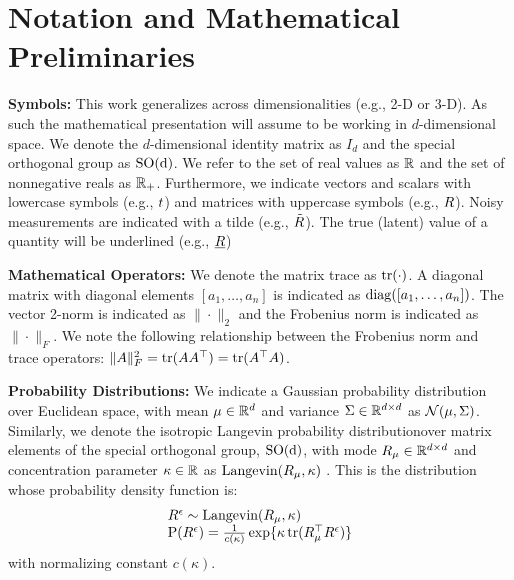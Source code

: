 \section{Notation and Mathematical Preliminaries}


\textbf{Symbols:} This work generalizes across dimensionalities (e.g., 2-D or
3-D). As such the mathematical presentation will assume to be working in
$d$-dimensional space.  We denote the $d$-dimensional identity matrix as $I_d$
and the special orthogonal group as $\operatorname{{\operatorname{SO}}(d)}$. We refer to the set of real values
as $\mathbb{R}$ and the set of nonnegative reals as $\mathbb{R}_{+}$. Furthermore, we indicate vectors and
scalars with lowercase symbols (e.g., $t$) and matrices with uppercase
symbols (e.g.,  $R$). Noisy measurements are indicated with a tilde (e.g.,
$\tilde{R}$). The true (latent) value of a quantity will be underlined (e.g.,
$\underline{R}$)

\textbf{Mathematical Operators:} We denote the matrix trace as $\operatorname{tr} (\cdot)$. A
diagonal matrix with diagonal elements $[a_1, \ldots, a_n]$ is indicated as
$\operatorname{diag} ([a_1, \ldots, a_n])$. The vector 2-norm is indicated as $\|
\cdot \|_2$ and the Frobenius norm is indicated as $\| \cdot \|_F$. We
note the following relationship between the Frobenius norm and trace operators:
$\| A \|_F^2 = \operatorname{tr}(A A^\top) = \operatorname{tr}(A^\top A)$.

\textbf{Probability Distributions:} We indicate a Gaussian probability
distribution over Euclidean space, with mean $\mu \in \mathbb{R}^d$ and variance
$\Sigma \in \mathbb{R}^{d\times d}$ as $\mathcal{N} (\mu, \Sigma)$. Similarly, we denote the
isotropic Langevin probability distribution\IsotropicLangevinFootnote over
matrix elements of the special orthogonal group, $\operatorname{{\operatorname{SO}}(d)}$, with mode $R_\mu \in
\mathbb{R}^{d\times d}$ and concentration parameter $\kappa \in \mathbb{R}$ as $\operatorname{Langevin} (R_\mu,
\kappa)$ \cite{chiuso08infosys}.
This is the distribution whose probability density function is:
\begin{equation}
    \label{eq:langevin-distribution}
    \begin{array}{ll}
        {R}^{\epsilon} \sim \text{Langevin}(R_\mu, \kappa) \\ \operatorname{P}( {R}^{\epsilon} )
        = \frac{1}{c(\kappa)} \exp\{\kappa \operatorname{tr} (R_\mu^\top
        {R}^{\epsilon})\}
    \end{array}
\end{equation}
with normalizing constant $c(\kappa)$.
